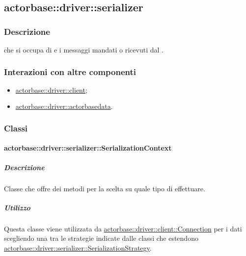 \documentclass{scalatekids-article}
\begin{document}
\subsection{actorbase::driver::serializer}
\label{sec:actorbase::driver::serializer}

\subsubsection{Descrizione}

 che si occupa di  e 
i messaggi mandati o ricevuti dal .

\subsubsection{Interazioni con altre componenti}

\begin{itemize}

\item \hyperref[sec:actorbase::driver::client]{actorbase::driver::client};
\item \hyperref[sec:actorbase::driver::actorbasedata]{actorbase::driver::actorbasedata}.

\end{itemize}

\subsubsection{Classi}

\paragraph{actorbase::driver::serializer::SerializationContext}
\label{sec:actorbase::driver::serializer::SerializationContext}

\subparagraph{Descrizione}

Classe che offre dei metodi per la scelta su quale tipo di 
effettuare.

\subparagraph{Utilizzo}

Questa classe viene utilizzata da \hyperref[sec:actorbase::driver::client::Connection]{actorbase::driver::client::Connection}
per  i dati scegliendo una tra le strategie indicate
dalle classi che estendono \hyperref[sec:actorbase::driver::serializer::SerializationStrategy]{actorbase::driver::serializer::SerializationStrategy}.
\end{document}
